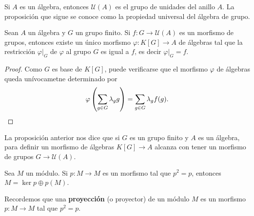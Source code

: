 Si $A$ es un álgebra, entonces $\mathcal{U}(A)$ es el grupo de unidades del anillo $A$. 
La proposición que sigue se conoce como la propiedad universal del álgebra de grupo.

\begin{proposition}
Sean $A$ un álgebra y $G$ un grupo finito. Si $f\colon G\to\mathcal{U}(A)$ es un morfismo de grupos, entonces
existe un único morfismo $\varphi\colon K[G]\to A$ de álgebras tal que la restricción
$\varphi|_G$ de $\varphi$ al grupo $G$ es igual a $f$, es decir 	$\varphi|_G=f$. 
\end{proposition}

\begin{proof}
Como $G$ es base de $K[G]$, puede verificarse que 
el morfismo $\varphi$ de álgebras 
queda unívocametne determinado por 
\[
\varphi\left(\sum_{g\in G}\lambda_gg\right)=\sum_{g\in G}\lambda_gf(g).\qedhere
\]	
\end{proof}

La proposición anterior nos dice que si $G$ es un grupo finito y $A$ es un álgebra, 
para definir un morfismo de álgebras $K[G]\to A$ 
alcanza con tener un morfismo de grupos $G\to\mathcal{U}(A)$.  

\begin{exercise}
Sea $M$ un módulo. 
Si $p\colon M\to M$ es un morfismo tal que $p^2=p$, entonces 
$M=\ker p\oplus p(M)$.
\end{exercise}


Recordemos que 
una \textbf{proyección} (o proyector) de un módulo $M$ es un   
morfismo $p\colon M\to M$ tal que $p^2=p$. 
 

